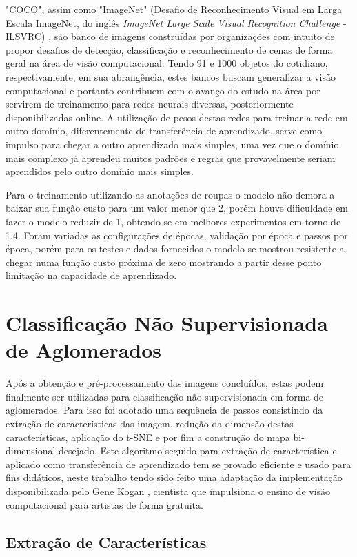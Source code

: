 \documentclass[12pt]{report}
\begin{document}
"COCO", assim como "ImageNet" (Desafio de Reconhecimento Visual em Larga Escala ImageNet, do inglês \textit{ImageNet Large Scale Visual Recognition Challenge} - ILSVRC) \cite{imagenet}, são banco de imagens construídas por organizações com intuito de propor desafios de detecção, classificação e reconhecimento de cenas de forma geral na área de visão computacional. Tendo 91 e 1000 objetos do cotidiano, respectivamente, em sua abrangência, estes bancos buscam generalizar a visão computacional e portanto contribuem com o avanço do estudo na área por servirem de treinamento para redes neurais diversas, posteriormente disponibilizadas online. A utilização de pesos destas redes para treinar a rede em outro domínio, diferentemente de transferência de aprendizado, serve como impulso para chegar a outro aprendizado mais simples, uma vez que o domínio mais complexo já aprendeu muitos padrões e regras que provavelmente seriam aprendidos pelo outro domínio mais simples.

Para o treinamento utilizando as anotações de roupas o modelo não demora a baixar sua função custo para um valor menor que 2, porém houve dificuldade em fazer o modelo reduzir de 1, obtendo-se em melhores experimentos em torno de 1,4. Foram variadas as configurações de épocas, validação por época e passos por época, porém para os testes e dados fornecidos o modelo se mostrou resistente a chegar numa função custo próxima de zero mostrando a partir desse ponto limitação na capacidade de aprendizado. 

\section{Classificação Não Supervisionada de Aglomerados}

Após a obtenção e pré-processamento das imagens concluídos, estas podem finalmente ser utilizadas para classificação não supervisionada em forma de aglomerados. Para isso foi adotado uma sequência de passos consistindo da extração de características das imagem, redução da dimensão destas características, aplicação do \ac{t-SNE} e por fim a construção do mapa bi-dimensional desejado. Este algoritmo seguido para extração de característica e aplicado como transferência de aprendizado tem se provado eficiente e usado para fins didáticos, neste trabalho tendo sido feito uma adaptação da implementação disponibilizada pelo Gene Kogan \cite{ml4a}, cientista que impulsiona o ensino de visão computacional para artistas de forma gratuita.

\subsection{Extração de Características}
\end{document}
